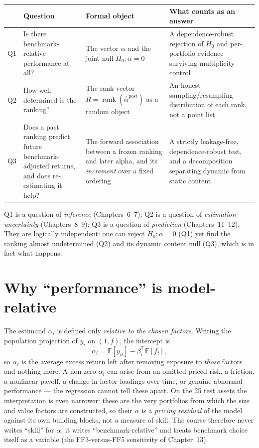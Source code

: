 \begin{longtable}[]{@{}p{}p{}p{}p{}@{}}
\toprule\noalign{}
& Question & Formal object & What counts as an answer \\
\midrule\noalign{}
\endhead
\bottomrule\noalign{}
\endlastfoot
Q1 & Is there benchmark-relative performance at all? & The vector
$\alpha$ and the joint null $H_0:\alpha=0$ & A dependence-robust rejection
of $H_0$ and per-portfolio evidence surviving multiplicity control \\
Q2 & How well-determined is the ranking? & The rank vector
$R=\operatorname{rank}(\hat\alpha^{\mathrm{post}})$ as a random object &
An honest sampling/resampling distribution of each rank, not a point list \\
Q3 & Does a past ranking predict future benchmark-adjusted returns, and
does re-estimating it help? & The forward association between a frozen
ranking and later alpha, and its \emph{increment} over a fixed ordering &
A strictly leakage-free, dependence-robust test, and a decomposition
separating dynamic from static content \\
\end{longtable}

Q1 is a question of \emph{inference} (Chapters~6--7); Q2 is a question of
\emph{estimation uncertainty} (Chapters~8--9); Q3 is a question of
\emph{prediction} (Chapters~11--12). They are logically independent: one
can reject $H_0:\alpha=0$ (Q1) yet find the ranking almost undetermined
(Q2) and its dynamic content null (Q3), which is in fact what happens.

\section{Why ``performance'' is model-relative}\label{rq-model-relative}

The estimand $\alpha_i$ is defined only \emph{relative to the chosen
factors}. Writing the population projection of $y_i$ on $(1,f)$, the
intercept is
\begin{equation}
\alpha_i=\mathbb{E}[y_{it}]-\beta_i^{\top}\mathbb{E}[f_t],
\end{equation}
so $\alpha_i$ is the average excess return left after removing exposure to
\emph{those} factors and nothing more. A non-zero $\alpha_i$ can arise from
an omitted priced risk, a friction, a nonlinear payoff, a change in factor
loadings over time, or genuine abnormal performance --- the regression
cannot tell these apart. On the 25 test assets the interpretation is even
narrower: these are the very portfolios from which the size and value
factors are constructed, so their $\alpha$ is a \emph{pricing residual} of
the model against its own building blocks, not a measure of skill. The
course therefore never writes ``skill'' for $\alpha$; it writes
``benchmark-relative'' and treats benchmark choice itself as a variable
(the FF3-versus-FF5 sensitivity of Chapter~13).


